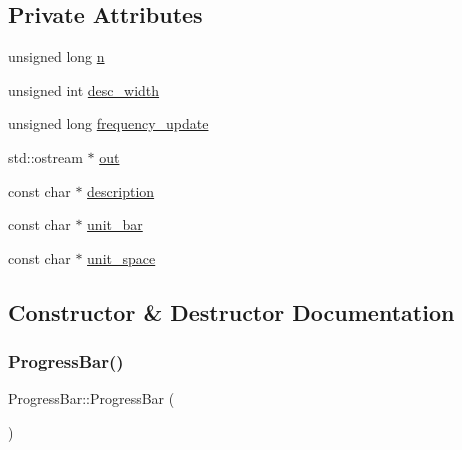 \subsection*{Private Attributes}
\begin{DoxyCompactItemize}
\item 
unsigned long \mbox{\hyperlink{class_progress_bar_a5eaa1945817db865bd2946886fed18d7}{n}}
\item 
unsigned int \mbox{\hyperlink{class_progress_bar_aba94b734f8c8f4069ec6419910791967}{desc\+\_\+width}}
\item 
unsigned long \mbox{\hyperlink{class_progress_bar_aed5b7d67c32ea53f012e4330325f8659}{frequency\+\_\+update}}
\item 
std\+::ostream $\ast$ \mbox{\hyperlink{class_progress_bar_a037918f48f22bb6414ef2b8f277bb370}{out}}
\item 
const char $\ast$ \mbox{\hyperlink{class_progress_bar_a8a36c3d4386d2c8515dad7aa0c9d4ff2}{description}}
\item 
const char $\ast$ \mbox{\hyperlink{class_progress_bar_ac5fe04d7f2dee49bff858171911e866c}{unit\+\_\+bar}}
\item 
const char $\ast$ \mbox{\hyperlink{class_progress_bar_aa5c12a9e11e108c8ead079f3456e9631}{unit\+\_\+space}}
\end{DoxyCompactItemize}


\subsection{Constructor \& Destructor Documentation}
\mbox{\label{class_progress_bar_aabdebc9823af01c7567e7546d9f0016f}} 
\subsubsection{\texorpdfstring{ProgressBar()}{ProgressBar()}\hspace{0.1cm}{\footnotesize\ttfamily [1/2]}}
{\footnotesize\ttfamily Progress\+Bar\+::\+Progress\+Bar (\begin{DoxyParamCaption}{ }\end{DoxyParamCaption})}

\mbox{\label{class_progress_bar_a9dd87a5354a70db0f2dc58ee471ab11a}} 
